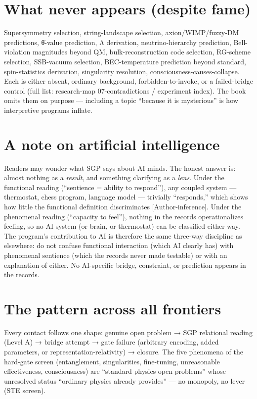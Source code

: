 \documentclass[
  11pt,
]{book}
\begin{document}
\section{What never appears (despite
fame)}\label{what-never-appears-despite-fame}

Supersymmetry selection, string-landscape selection, axion/WIMP/fuzzy-DM
predictions, θ̄-value prediction, Λ derivation, neutrino-hierarchy
prediction, Bell-violation magnitudes beyond QM, bulk-reconstruction
code selection, RG-scheme selection, SSB-vacuum selection,
BEC-temperature prediction beyond standard, spin-statistics derivation,
singularity resolution, consciousness-causes-collapse. Each is either
absent, ordinary background, forbidden-to-invoke, or a failed-bridge
control (full list: research-map 07-contradictions / experiment index).
The book omits them on purpose --- including a topic ``because it is
mysterious'' is how interpretive programs inflate.

\section{A note on artificial
intelligence}\label{a-note-on-artificial-intelligence}

Readers may wonder what SGP says about AI minds. The honest answer is:
almost nothing as a \emph{result}, and something clarifying as a
\emph{lens}. Under the functional reading (``sentience = ability to
respond''), any coupled system --- thermostat, chess program, language
model --- trivially ``responds,'' which shows how little the functional
definition discriminates {[}Author-inference{]}. Under the phenomenal
reading (``capacity to feel''), nothing in the records operationalizes
feeling, so no AI system (or brain, or thermostat) can be classified
either way. The program's contribution to AI is therefore the same
three-way discipline as elsewhere: do not confuse functional interaction
(which AI clearly has) with phenomenal sentience (which the records
never made testable) or with an explanation of either. No AI-specific
bridge, constraint, or prediction appears in the records.

\section{The pattern across all
frontiers}\label{the-pattern-across-all-frontiers}

Every contact follows one shape: genuine open problem → SGP relational
reading (Level A) → bridge attempt → gate failure (arbitrary encoding,
added parameters, or representation-relativity) → closure. The five
phenomena of the hard-gate screen (entanglement, singularities,
fine-tuning, unreasonable effectiveness, consciousness) are ``standard
physics open problems'' whose unresolved status ``ordinary physics
already provides'' --- no monopoly, no lever (STE screen).
\end{document}
